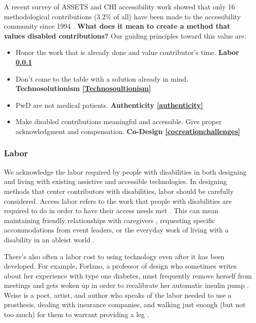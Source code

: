 A recent survey of ASSETS and CHI accessibility work showed that only 16 methodological contributions (3.2\% of all)  have been made to the accessibility community since 1994  \cite{mackWhatWeMean2021}.
\textbf{What does it mean to create a method that values disabled contributions? } Our guiding principles toward this value are:
\begin{itemize}
\item Honor the work that is already done and value contributor's time. \textbf{Labor \ref{Labor}}
\item Don't come to the table with a solution already in mind. \textbf{Technosolutionism \ref{Technosoultionism}}
\item PwD are not medical patients. \textbf{Authenticity \ref{authenticity}}
\item Make disabled contributions meaningful and accessible. Give proper acknowledgment and compensation. \textbf{Co-Design \ref{cocreationchallenges}}
\end{itemize}


\subsubsection{Labor} \label{Labor}

We acknowledge the labor required by people with disabilities in both designing and living with existing assistive and accessible technologies. In designing methods that center contributors with disabilities, labor should be carefully considered. Access labor refers to the work that people with disabilities are required to do in order to have their access needs met \cite{bennettBiographicalPrototypesReimagining2019,mackWhatWeMean2021,piepzna-samarasinhaCareWorkDreaming2018} . This can mean maintaining friendly relationships with caregivers \cite{kittayLoveLaborEssays1999}, requesting specific accommodations from event leaders, or the everyday work of living with a disability in an ableist world \cite{hanssonEthicsEnablingTechnology2007a}. 

There's also often a labor cost to using technology even after it has been developed. For example, Forlano, a professor of design who sometimes writes about her experience with type one diabetes, must frequently remove herself from meetings and gets woken up in order to recalibrate her automatic insulin pump \cite{forlanoDangerIntimateAlgorithms2019}. Weise is a poet, artist, and author who speaks of the labor needed to use a prosthesis, dealing with insurance companies, and walking just enough (but not too much) for them to warrant providing a leg \cite{weiseCommonCyborg2018}. 

